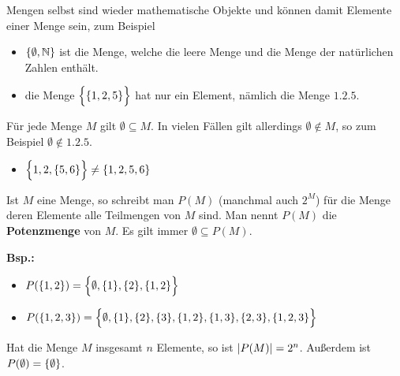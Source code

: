 \documentclass{scrreprt}
\begin{document}
Mengen selbst sind wieder mathematische Objekte und können damit Elemente
einer Menge sein, zum Beispiel
\begin{itemize}
\item $\qty{\emptyset, \mathbb{N}}$ ist die Menge, welche die leere Menge und
  die Menge der natürlichen Zahlen enthält.

\item die Menge $\qty\Big{\qty{1, 2, 5}}$ hat nur ein Element, nämlich die Menge
  $\qty{1, 2, 5}$.
\end{itemize}

Für jede Menge $M$ gilt $\emptyset \subseteq M$.
In vielen Fällen gilt allerdings $\emptyset \notin M$,
so zum Beispiel $\emptyset \notin \qty{1, 2, 5}$.
\begin{itemize}
\item $\qty\Big{1, 2, \qty{5, 6}} \ne \qty{1, 2, 5, 6}$
\end{itemize}

Ist $M$ eine Menge, so schreibt man $P(M)$ (manchmal auch $2^M$)
für die Menge deren Elemente alle Teilmengen von $M$ sind.
Man nennt $P(M)$ die \textbf{Potenzmenge} von $M$.
Es gilt immer $\emptyset \subseteq P(M)$.

\textbf{Bsp.:}
\begin{itemize}
\item $P(\qty{1, 2}) = \qty\Big{\emptyset, \qty{1}, \qty{2}, \qty{1, 2}}$
\item $P(\qty{1, 2, 3}) =
  \qty\Big{\emptyset, \qty{1}, \qty{2}, \qty{3}, \qty{1, 2}, \qty{1, 3},
    \qty{2, 3}, \qty{1, 2, 3}}$
\end{itemize}

Hat die Menge $M$ insgesamt $n$ Elemente, so ist $\abs{P(M)} = 2^n$.
Außerdem ist $P(\emptyset) = \qty{\emptyset}$.
\end{document}
